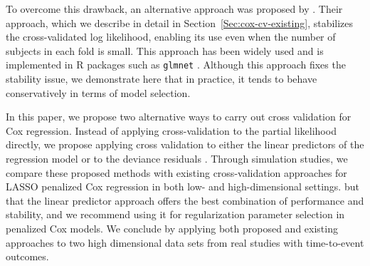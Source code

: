 


\par To overcome this drawback, an alternative approach was proposed by \citet{Verweij1993}.  Their approach, which we describe in detail in Section~\ref{Sec:cox-cv-existing}, stabilizes the cross-validated log likelihood, enabling its use even when the number of subjects in each fold is small.  This approach has been widely used and is implemented in R packages such as {\tt glmnet} \citep{glmnet}.  Although this approach fixes the stability issue, we demonstrate here that in practice, it tends to behave conservatively in terms of model selection.

\par In this paper, we propose two alternative ways to carry out cross validation for Cox regression. Instead of applying cross-validation to the partial likelihood directly, we propose applying cross validation to either the linear predictors of the regression model or to the deviance residuals \citep{Therneau1990}. Through simulation studies, we compare these proposed methods with existing cross-validation approaches for LASSO penalized Cox regression in both low- and high-dimensional settings.   but that the linear predictor approach offers the best combination of performance and stability, and we recommend using it for regularization parameter selection in penalized Cox models.  We conclude by applying both proposed and existing approaches to two high dimensional data sets from real studies with time-to-event outcomes.

